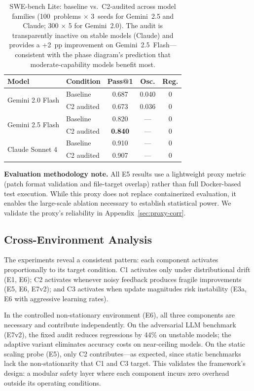 \documentclass{article}
\begin{document}
\begin{table}[h]
\centering
\caption{SWE-bench Lite: baseline vs.\ C2-audited across model families
  (100~problems $\times$ 3~seeds for Gemini~2.5 and Claude;
  300 $\times$ 5 for Gemini~2.0). The audit is transparently inactive
  on stable models (Claude) and provides a +2~pp improvement on
  Gemini~2.5~Flash---consistent with the phase diagram's prediction
  that moderate-capability models benefit most.}
\label{tab:multi-llm}
\small
\begin{tabular}{@{}llccc@{}}
\toprule
\textbf{Model} & \textbf{Condition} & \textbf{Pass@1} & \textbf{Osc.} & \textbf{Reg.} \\
\midrule
\multirow{2}{*}{Gemini 2.0 Flash} & Baseline & 0.687 & 0.040 & 0 \\
  & C2 audited & 0.673 & 0.036 & 0 \\
\midrule
\multirow{2}{*}{Gemini 2.5 Flash} & Baseline & 0.820 & --- & 0 \\
  & C2 audited & \textbf{0.840} & --- & 0 \\
\midrule
\multirow{2}{*}{Claude Sonnet 4} & Baseline & 0.910 & --- & 0 \\
  & C2 audited & 0.907 & --- & 0 \\
\bottomrule
\end{tabular}
\end{table}

\textbf{Evaluation methodology note.}
All E5 results use a lightweight proxy metric (patch format validation
and file-target overlap) rather than full Docker-based test execution.
While this proxy does not replace containerized evaluation, it enables
the large-scale ablation necessary to establish statistical power.
We validate the proxy's reliability in Appendix~\ref{sec:proxy-corr}.


\subsection{Cross-Environment Analysis}
\label{sec:cross-env}

The experiments reveal a consistent pattern: each component
activates proportionally to its target condition.
C1 activates only under distributional drift (E1, E6);
C2 activates whenever noisy feedback produces fragile improvements
(E5, E6, E7v2); and C3 activates when update magnitudes risk
instability (E3a, E6 with aggressive learning rates).

In the controlled non-stationary environment (E6), all three
components are necessary and contribute independently.
On the adversarial LLM benchmark (E7v2), the fixed audit reduces
regressions by 44\% on unstable models; the adaptive variant
eliminates accuracy costs on near-ceiling models.
On the static scaling probe (E5), only C2 contributes---as
expected, since static benchmarks lack the non-stationarity that
C1 and C3 target.
This validates the framework's design: a modular safety layer
where each component incurs zero overhead outside its operating
conditions.
\end{document}
